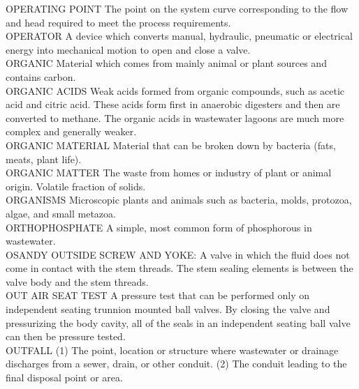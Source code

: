 OPERATING POINT
The point on the system curve corresponding to the flow and head required to meet the process requirements.
\vspace{0.3cm}\\
OPERATOR
A device which converts manual, hydraulic, pneumatic or electrical energy into mechanical motion to open and close a valve.
\vspace{0.3cm}\\
ORGANIC
Material which comes from mainly animal or plant sources and contains carbon. 
\vspace{0.3cm}\\
ORGANIC ACIDS
Weak acids formed from organic compounds, such as acetic acid and citric acid. These acids form first in anaerobic digesters and then are converted to methane. The organic acids in wastewater lagoons are much more complex and generally weaker.
\vspace{0.3cm}\\
ORGANIC MATERIAL
Material that can be broken down by bacteria (fats, meats, plant life).
\vspace{0.3cm}\\
ORGANIC MATTER
The waste from homes or industry of plant or animal origin. Volatile fraction of solids.
\vspace{0.3cm}\\
ORGANISMS
Microscopic plants and animals such as bacteria, molds, protozoa, algae, and small metazoa.
\vspace{0.3cm}\\
ORTHOPHOSPHATE
A simple, most common form of phosphorous in wastewater.
\vspace{0.3cm}\\
OSANDY
OUTSIDE SCREW AND YOKE:  A valve in which the fluid does not come in contact with the stem threads. The stem sealing elements is between the valve body and the stem threads.
\vspace{0.3cm}\\
OUT AIR SEAT TEST
A pressure test that can be performed only on independent seating trunnion mounted ball valves. By closing the valve and pressurizing the body cavity, all of the seals in an independent seating ball valve can then be pressure tested.
\vspace{0.3cm}\\
OUTFALL
(1) The point, location or structure where wastewater or drainage discharges from a sewer, drain, or other conduit. (2) The conduit leading to the final disposal point or area. 
\vspace{0.3cm}\\
